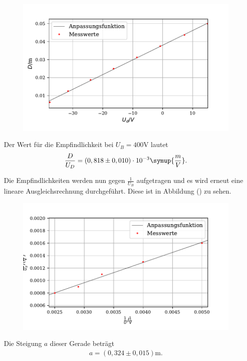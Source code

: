 \begin{figure}[H]
  \centering
  \includegraphics{plot7.pdf}
  \caption{}
  \label{fig:plot}
\end{figure}

Der Wert für die Empfindlichkeit bei $U_B = 400 \si{\volt}$ lautet
\begin{align*}
\frac{D}{U_D} = (0,818 \pm 0,010) \cdot 10^{-3} \symup{\frac{m}{V}} .
\end{align*}

Die Empfindlichkeiten werden nun gegen $\frac{1}{U_B}$ aufgetragen und es wird erneut eine lineare Ausgleichsrechnung durchgeführt. Diese ist in Abbildung () zu sehen.

\begin{figure}[H]
  \centering
  \includegraphics{plot8.pdf}
  \caption{}
  \label{fig:plot}
\end{figure}

Die Steigung $a$ dieser Gerade beträgt
\begin{align*}
a = (0,324 \pm 0,015)  \si{\meter} .
\end{align*}

